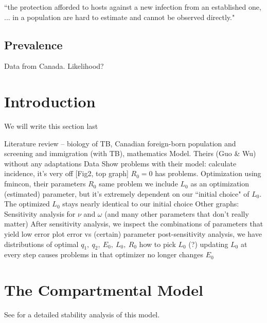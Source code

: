 \documentclass[sn-mathphys,Numbered]{sn-jnl}%
\theoremstyle{thmstyleone}%
\theoremstyle{thmstyletwo}%
\theoremstyle{thmstylethree}%
\begin{document}
\cite{Mulberry2020} ``the protection afforded to hosts against a new infection from an established one, ... in a population are hard to estimate and cannot be observed directly."  



\subsection{Prevalence}

Data from Canada.  Likelihood?



\section{Introduction}\label{sec1}

We will write this section last

\begin{outline}
    \1 Literature review -- biology of TB, Canadian foreign-born population and screening and immigration (with TB), mathematics 
    \1 Model. Theirs (Guo \& Wu) without any adaptations
        \2 Data
    \1 Show problems with their model: 
        \2 calculate incidence, it's very off [Fig2, top graph]
        \2 $R_0=0$ has problems.
    \1 Optimization using fmincon, their parameters
        \2 $R_0$ same problem
        \2 we include $L_0$ as an optimization (estimated) parameter, but it's extremely dependent on our ``initial choice" of $L_0$.  The optimized $L_0$ stays nearly identical to our initial choice
    \1 Other graphs:
        \2 Sensitivity analysis for $\nu$ and $\omega$ (and many other parameters that don't really matter)
        \2 After sensitivity analysis, we inspect the combinations of parameters that yield low error
        \2 plot error vs (certain) parameter
        \2 post-sensitivity analysis, we have distributions of optimal $q_1,~q_2,~E_0,~ L_0,~ R_0$
        \2 how to pick $L_0$
        \2 (?) updating $L_0$ at every step causes problems in that optimizer no longer changes $E_0$
\end{outline}


\section{The Compartmental Model}\label{sec3}


See \citet{Guo2011PersistentLatency} for a detailed stability analysis of this model.
\end{document}
